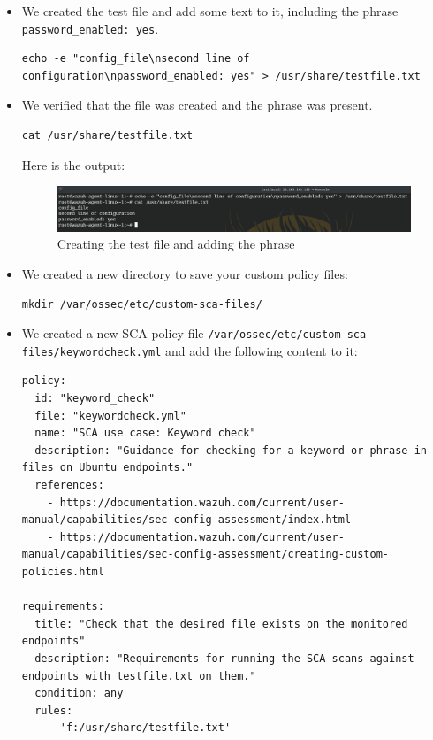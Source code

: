 \begin{itemize}
    \item We created the test file and add some text to it, including the phrase \texttt{password\_enabled: yes}.
          \begin{verbatim}
echo -e "config_file\nsecond line of configuration\npassword_enabled: yes" > /usr/share/testfile.txt
        \end{verbatim}

    \item We verified that the file was created and the phrase was present.
          \begin{verbatim}
cat /usr/share/testfile.txt
        \end{verbatim}
          Here is the output:
          \begin{figure} [H]
              \centering
              \includegraphics[width=\textwidth]{images/sca/sca-1.png}
              \caption{Creating the test file and adding the phrase}
              \label{fig:sca-1}
          \end{figure}
    \item We created a new directory to save your custom policy files:
          \begin{verbatim}
mkdir /var/ossec/etc/custom-sca-files/
        \end{verbatim}

    \item We created a new SCA policy file \texttt{/var/ossec/etc/custom-sca-files/keywordcheck.yml} and add the following content to it:
        \begin{verbatim}
policy:
  id: "keyword_check"
  file: "keywordcheck.yml"
  name: "SCA use case: Keyword check"
  description: "Guidance for checking for a keyword or phrase in files on Ubuntu endpoints."
  references:
    - https://documentation.wazuh.com/current/user-manual/capabilities/sec-config-assessment/index.html
    - https://documentation.wazuh.com/current/user-manual/capabilities/sec-config-assessment/creating-custom-policies.html

requirements:
  title: "Check that the desired file exists on the monitored endpoints"
  description: "Requirements for running the SCA scans against endpoints with testfile.txt on them."
  condition: any
  rules:
    - 'f:/usr/share/testfile.txt'


\end{verbatim}
\end{itemize}
